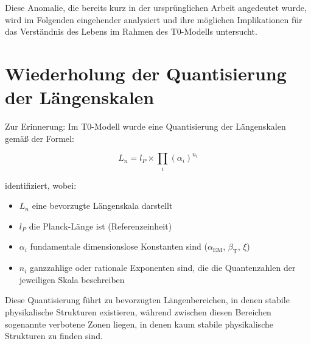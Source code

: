 \documentclass[12pt,a4paper]{article}
\newcommand{\alphaEM}{\alpha_{\text{EM}}}
\newcommand{\betaT}{\beta_{\text{T}}}
\begin{document}
	Diese Anomalie, die bereits kurz in der ursprünglichen Arbeit angedeutet wurde, wird im Folgenden eingehender analysiert und ihre möglichen Implikationen für das Verständnis des Lebens im Rahmen des T0-Modells untersucht.
	
	\section{Wiederholung der Quantisierung der Längenskalen}
	\label{sec:wiederholung_quantisierung}
	
	Zur Erinnerung: Im T0-Modell wurde eine Quantisierung der Längen\-skalen gemäß der Formel:
	
	\begin{equation}
		L_n = l_P \times \prod_{i} (\alpha_i)^{n_i}
	\end{equation}
	
	identifiziert, wobei:
	\begin{itemize}
		\item $L_n$ eine bevorzugte Längen\-skala darstellt
		\item $l_P$ die Planck-Länge ist (Referenz\-einheit)
		\item $\alpha_i$ fundamentale dimensionslose Konstanten sind ($\alphaEM$, $\betaT$, $\xi$)
		\item $n_i$ ganzzahlige oder rationale Exponenten sind, die die \glqq Quantenzahlen\grqq{} der jeweiligen Skala beschreiben
	\end{itemize}
	
	Diese Quantisierung führt zu bevorzugten Längen\-bereichen, in denen stabile physikalische Strukturen existieren, während zwischen diesen Bereichen sogenannte \glqq verbotene Zonen\grqq{} liegen, in denen kaum stabile physikalische Strukturen zu finden sind.
	
\end{document}
